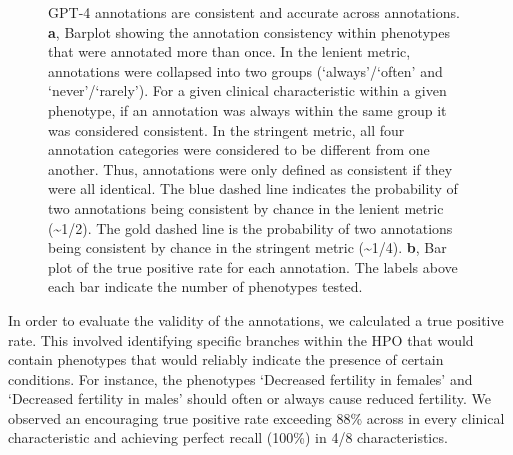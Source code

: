 \documentclass[
]{agujournal2019}
\begin{document}
\label{cell-fig-checks}
\begin{figure}[H]


\caption{\label{fig-checks}GPT-4 annotations are consistent and accurate
across annotations. \textbf{a}, Barplot showing the annotation
consistency within phenotypes that were annotated more than once. In the
lenient metric, annotations were collapsed into two groups
(`always'/`often' and `never'/`rarely'). For a given clinical
characteristic within a given phenotype, if an annotation was always
within the same group it was considered consistent. In the stringent
metric, all four annotation categories were considered to be different
from one another. Thus, annotations were only defined as consistent if
they were all identical. The blue dashed line indicates the probability
of two annotations being consistent by chance in the lenient metric
(\textasciitilde1/2). The gold dashed line is the probability of two
annotations being consistent by chance in the stringent metric
(\textasciitilde1/4). \textbf{b}, Bar plot of the true positive rate for
each annotation. The labels above each bar indicate the number of
phenotypes tested.}

\end{figure}%

In order to evaluate the validity of the annotations, we calculated a
true positive rate. This involved identifying specific branches within
the HPO that would contain phenotypes that would reliably indicate the
presence of certain conditions. For instance, the phenotypes `Decreased
fertility in females' and `Decreased fertility in males' should often or
always cause reduced fertility. We observed an encouraging true positive
rate exceeding 88\% across in every clinical characteristic and
achieving perfect recall (100\%) in 4/8 characteristics.
\end{document}
